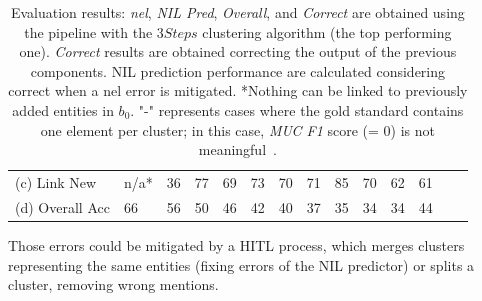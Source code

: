 \begin{table}
\begin{tabular}{llrrrrrrrrrrrr}
(c) Link New & n/a* & 36 & 77 & 69 & 73 & 70 & 71 & 85 & 70 & 62 & 61 & \\ 
(d) Overall Acc & 66 & 56 & 50 & 46 & 42 & 40 & 37 & 35 & 34 & 34 & 44 & \\ 
\bottomrule
\end{tabular}
    \caption{Evaluation results: \textit{\ac{nel}}, \textit{NIL Pred}, \textit{Overall}, and \textit{Correct} are obtained using the pipeline with the $3Steps$ clustering algorithm (the top performing one). \textit{Correct} results are obtained correcting the output of the previous components. NIL prediction performance are calculated considering correct when a \ac{nel} error is mitigated. *Nothing can be linked to previously added entities in $b_{0}$. "-" represents cases where the gold standard contains one element per cluster; in this case, \textit{MUC F1} score (= 0) is not meaningful~\cite{recasens_hovy_2011}.}
    \label{tab:superresults}
\end{table}

Those errors could be mitigated by a HITL process, which merges clusters representing the same entities (fixing errors of the NIL predictor) or splits a cluster, removing wrong mentions.


